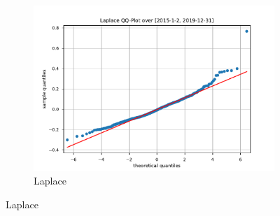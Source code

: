 \begin{figure}[htbp]
\begin{subfigure}[b]{0.32\textwidth}
        \includegraphics[width=\textwidth]{content/reschap4/Figures/laplace_QQ_2015-1-2-2019-12-31.pdf}
        \caption{Laplace}
    \end{subfigure}


\end{figure}
